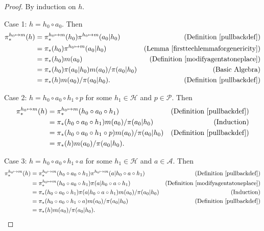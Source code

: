 \documentclass[runningheads]{llncs}
\begin{document}
\begin{proof}
    By induction on $h$.

    Case 1: $h=h_0\circ a_0$. Then
    \begin{align*}
        \pi^{h_0\mapsto m}_*(h)
        &= \pi^{h_0\mapsto m}_*(h_0)\pi^{h_0\mapsto m}(a_0|h_0)
            &\mbox{(Definition \ref{pullbackdef})}\\
        &= \pi_*(h_0)\pi^{h_0\mapsto m}(a_0|h_0)
            &\mbox{(Lemma \ref{firsttechlemmaforgenericity})}\\
        &= \pi_*(h_0)m(a_0)
            &\mbox{(Definition \ref{modifyagentatoneplace})}\\
        &= \pi_*(h_0)\pi(a_0|h_0)m(a_0)/\pi(a_0|h_0)
            &\mbox{(Basic Algebra)}\\
        &= \pi_*(h)m(a_0)/\pi(a_0|h_0).
            &\mbox{(Definition \ref{pullbackdef})}
    \end{align*}

    Case 2: $h=h_0\circ a_0\circ h_1\circ p$ for some $h_1\in\mathcal H$
        and $p\in\mathcal P$. Then
    \begin{align*}
        \pi^{h_0\mapsto m}_*(h)
        &= \pi^{h_0\mapsto m}_*(h_0\circ a_0\circ h_1)
            &\mbox{(Definition \ref{pullbackdef})}\\
        &= \pi_*(h_0\circ a_0\circ h_1)m(a_0)/\pi(a_0|h_0)
            &\mbox{(Induction)}\\
        &= \pi_*(h_0\circ a_0\circ h_1\circ p)m(a_0)/\pi(a_0|h_0)
            &\mbox{(Definition \ref{pullbackdef})}\\
        &= \pi_*(h)m(a_0)/\pi(a_0|h_0).
    \end{align*}

    Case 3: $h=h_0\circ a_0\circ h_1\circ a$ for some $h_1\in\mathcal H$ and
        $a\in\mathcal A$. Then
    \begin{align*}
        \pi^{h_0\mapsto m}_*(h)
        &= \pi^{h_0\mapsto m}_*(h_0\circ a_0\circ h_1)
            \pi^{h_0\mapsto m}(a|h_0\circ a\circ h_1)
            &\mbox{(Definition \ref{pullbackdef})}\\
        &= \pi^{h_0\mapsto m}_*(h_0\circ a_0\circ h_1)
            \pi(a|h_0\circ a\circ h_1)
            &\mbox{(Definition \ref{modifyagentatoneplace})}\\
        &= \pi_*(h_0\circ a_0\circ h_1)\pi(a|h_0\circ a\circ h_1)m(a_0)/\pi(a_0|h_0)
            &\mbox{(Induction)}\\
        &= \pi_*(h_0\circ a_0\circ h_1\circ a)m(a_0)/\pi(a_0|h_0)
            &\mbox{(Definition \ref{pullbackdef})}\\
        &= \pi_*(h)m(a_0)/\pi(a_0|h_0).
    \end{align*}
\end{proof}
\end{document}
